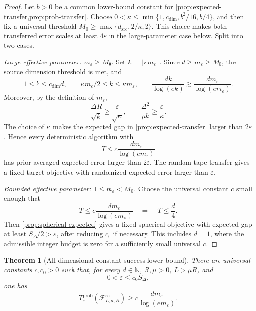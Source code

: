 \documentclass[11pt]{article}
\newcommand{\cF}{\mathcal{F}}
\newcommand{\eps}{\varepsilon}
\theoremstyle{plain}
\newtheorem{theorem}{Theorem}[section]
\theoremstyle{definition}
\begin{document}
\begin{proof}
Let $b>0$ be a common lower-bound constant for
\cref{prop:expected-transfer,prop:prob-transfer}. Choose
$0<\kappa\le\min\{1,c_{\mathrm{dim}},b^2/16,b/4\}$,
and then fix a universal threshold
$M_0\ge\max\{d_{\mathrm{src}},2/\kappa,2\}$.
This choice makes both transferred error scales at least $4\eps$
in the large-parameter case below. Split into two cases.

\emph{Large effective parameter: $m_\eps\ge M_0$.}
Set $k=\lfloor\kappa m_\eps\rfloor$.  Since $d\ge m_\eps\ge M_0$, the source dimension threshold is met, and
\[
  1\le k\le c_{\mathrm{dim}}d,
  \qquad
  \kappa m_\eps/2\le k\le\kappa m_\eps,
  \qquad
  \frac{dk}{\log(ek)}\gtrsim\frac{dm_\eps}{\log(em_\eps)}.
\]
Moreover, by the definition of $m_\eps$,
\[
  \frac{\Delta R}{\sqrt{k}}\ge\frac{\eps}{\sqrt\kappa},
  \qquad
  \frac{\Delta^2}{\mu k}\ge\frac{\eps}{\kappa}.
\]
The choice of $\kappa$ makes the expected gap in \cref{prop:expected-transfer} larger than $2\eps$.  Hence every deterministic algorithm with
\[
  T\le c\frac{dm_\eps}{\log(em_\eps)}
\]
has prior-averaged expected error larger than $2\eps$.  The random-tape transfer gives a fixed target objective with randomized expected error larger than $\eps$.

\emph{Bounded effective parameter: $1\le m_\eps<M_0$.}
Choose the universal constant $c$ small enough that
\[
  T\le c\frac{dm_\eps}{\log(em_\eps)}
  \quad\Longrightarrow\quad
  T\le\frac d4.
\]
Then \cref{prop:spherical-expected} gives a fixed spherical objective with expected gap at least $S_\Delta/2>\eps$, after reducing $c_0$ if necessary.  This includes $d=1$, where the admissible integer budget is zero for a sufficiently small universal $c$.
\end{proof}

\begin{theorem}[All-dimensional constant-success lower bound]\label{thm:prob-lower}
There are universal constants $c,c_0>0$ such that, for every $d\in\mathbb N$, $R,\mu>0$, $L>\mu R$, and
\[
   0<\eps\le c_0S_\Delta,
\]
one has
\begin{equation}\label{eq:prob-main-lb}
  T^{\mathrm{prob}}_\eps(\cF^{\mathrm{sc}}_{L,\mu,R})
  \ge c\frac{d m_\eps}{\log(e m_\eps)}.
\end{equation}
\end{theorem}
\end{document}
